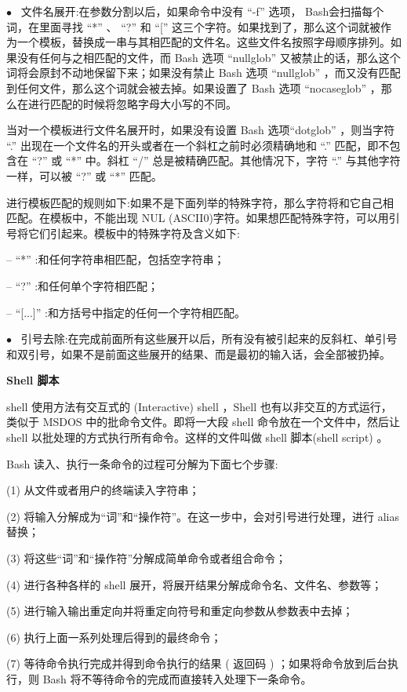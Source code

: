 \documentclass[12pt，a4paper]{article}
\numberwithin{equation}{section}
\begin{document}
$\bullet$~ 文件名展开:在参数分割以后，如果命令中没有 “-f” 选项， Bash会扫描每个词，在里面寻找 “*” 、 “?” 和 “[” 这三个字符。如果找到了，那么这个词就被作为一个模板，替换成一串与其相匹配的文件名。这些文件名按照字母顺序排列。如果没有任何与之相匹配的文件，而 Bash 选项 “nullglob” 又被禁止的话，那么这个词将会原封不动地保留下来；如果没有禁止 Bash 选项
“nullglob” ，而又没有匹配到任何文件，那么这个词就会被去掉。如果设置了 Bash 选项 “nocaseglob” ，那么在进行匹配的时候将忽略字母大小写的不同。

当对一个模板进行文件名展开时，如果没有设置 Bash 选项“dotglob” ，则当字符 “.” 出现在一个文件名的开头或者在一个斜杠之前时必须精确地和 “.” 匹配，即不包含在 “?” 或 “*” 中。斜杠 “/” 总是被精确匹配。其他情况下，字符 “.” 与其他字符一样，可以被 “?” 或 “*” 匹配。

进行模板匹配的规则如下:如果不是下面列举的特殊字符，那么字符将和它自己相匹配。在模板中，不能出现 NUL (ASCII0)字符。如果想匹配特殊字符，可以用引号将它们引起来。模板中的特殊字符及含义如下:

– “*” :和任何字符串相匹配，包括空字符串；

– “?” :和任何单个字符相匹配；

– “[...]” :和方括号中指定的任何一个字符相匹配。


$\bullet$~ 引号去除:在完成前面所有这些展开以后，所有没有被引起来的反斜杠、单引号和双引号，如果不是前面这些展开的结果、而是最初的输入话，会全部被扔掉。

\textbf{Shell 脚本}

shell 使用方法有交互式的 (Interactive) shell ，Shell 也有以非交互的方式运行，类似于 MSDOS 中的批命令文件。即将一大段 shell 命令放在一个文件中，然后让 shell 以批处理的方式执行所有命令。这样的文件叫做 shell 脚本(shell script) 。

Bash 读入、执行一条命令的过程可分解为下面七个步骤:

(1) 从文件或者用户的终端读入字符串；

(2) 将输入分解成为“词”和“操作符”。在这一步中，会对引号进行处理，进行 alias 替换；

(3) 将这些“词”和“操作符”分解成简单命令或者组合命令；

(4) 进行各种各样的 shell 展开，将展开结果分解成命令名、文件名、参数等；

(5) 进行输入输出重定向并将重定向符号和重定向参数从参数表中去掉；

(6) 执行上面一系列处理后得到的最终命令；

(7) 等待命令执行完成并得到命令执行的结果 ( 返回码 ) ；如果将命令放到后台执行，则 Bash 将不等待命令的完成而直接转入处理下一条命令。
\end{document}
